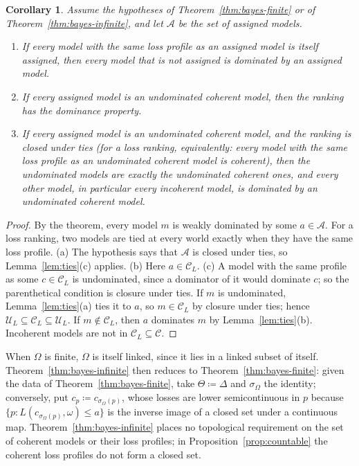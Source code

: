 \documentclass[11pt]{article}
\newtheorem{corollary}[theorem]{Corollary}
\theoremstyle{definition}
\theoremstyle{remark}
\newcommand{\C}{\mathcal C}
\newcommand{\U}{\mathcal U}
\begin{document}
\begin{corollary}\label{cor:bayes-coherent}
Assume the hypotheses of Theorem~\ref{thm:bayes-finite} or of Theorem~\ref{thm:bayes-infinite}, and let $\mathcal A$ be the set of assigned models.
\begin{enumerate}[label=(\alph*)]
\item If every model with the same loss profile as an assigned model is itself assigned, then every model that is not assigned is dominated by an assigned model.
\item If every assigned model is an undominated coherent model, then the ranking has the dominance property.
\item If every assigned model is an undominated coherent model, and the ranking is closed under ties (for a loss ranking, equivalently: every model with the same loss profile as an undominated coherent model is coherent), then the undominated models are exactly the undominated coherent ones, and every other model, in particular every incoherent model, is dominated by an undominated coherent model.
\end{enumerate}
\end{corollary}
\begin{proof}
By the theorem, every model $m$ is weakly dominated by some $a\in\mathcal A$. For a loss ranking, two models are tied at every world exactly when they have the same loss profile. (a) The hypothesis says that $\mathcal A$ is closed under ties, so Lemma~\ref{lem:ties}(c) applies. (b) Here $a\in\C_L$. (c) A model with the same profile as some $c\in\C_L$ is undominated, since a dominator of it would dominate $c$; so the parenthetical condition is closure under ties. If $m$ is undominated, Lemma~\ref{lem:ties}(a) ties it to $a$, so $m\in\C_L$ by closure under ties; hence $\U_L\subseteq\C_L\subseteq\U_L$. If $m\notin\C_L$, then $a$ dominates $m$ by Lemma~\ref{lem:ties}(b). Incoherent models are not in $\C_L\subseteq\C$.
\end{proof}

When $\Omega$ is finite, $\Omega$ is itself linked, since it lies in a linked subset of itself. Theorem~\ref{thm:bayes-infinite} then reduces to Theorem~\ref{thm:bayes-finite}: given the data of Theorem~\ref{thm:bayes-finite}, take $\Theta\coloneqq\Delta$ and $\sigma_\Omega$ the identity; conversely, put $c_p\coloneqq c_{\sigma_\Omega(p)}$, whose losses are lower semicontinuous in $p$ because $\{p:L(c_{\sigma_\Omega(p)},\omega)\le a\}$ is the inverse image of a closed set under a continuous map. Theorem~\ref{thm:bayes-infinite} places no topological requirement on the set of coherent models or their loss profiles; in Proposition~\ref{prop:countable} the coherent loss profiles do not form a closed set.
\end{document}
